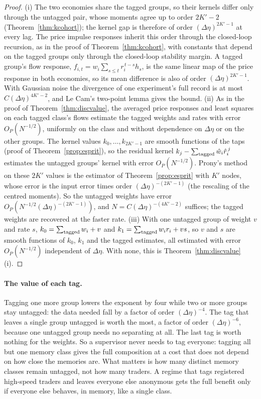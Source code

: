 \documentclass[12pt]{article}
\theoremstyle{definition}
\theoremstyle{remark}
\begin{document}
\begin{proof}
(i) The two economies share the tagged groups, so their kernels differ only through the untagged pair, whose moments agree up to order $2K'-2$ (Theorem~\ref{thm:kcohort}); the kernel gap is therefore of order $(\Delta\eta)^{2K'-1}$ at every lag. The price impulse responses inherit this order through the closed-loop recursion, as in the proof of Theorem~\ref{thm:kcohort}, with constants that depend on the tagged groups only through the closed-loop stability margin. A tagged group's flow response, $f_{i,t}=w_i\sum_{s\le t}r_i^{\,t-s}h_s$, is the same linear map of the price response in both economies, so its mean difference is also of order $(\Delta\eta)^{2K'-1}$. With Gaussian noise the divergence of one experiment's full record is at most $C(\Delta\eta)^{4K'-2}$, and Le Cam's two-point lemma gives the bound.
(ii) As in the proof of Theorem~\ref{thm:discvalue}, the averaged price responses and least squares on each tagged class's flows estimate the tagged weights and rates with error $O_P(N^{-1/2})$, uniformly on the class and without dependence on $\Delta\eta$ or on the other groups. The kernel values $k_0,\ldots,k_{2K'-1}$ are smooth functions of the taps (proof of Theorem~\ref{prop:esprit}), so the residual kernel $k_j-\sum_{\rm tagged}\hat w_i\hat r_i^{\,j}$ estimates the untagged groups' kernel with error $O_P(N^{-1/2})$. Prony's method on these $2K'$ values is the estimator of Theorem~\ref{prop:esprit} with $K'$ nodes, whose error is the input error times order $(\Delta\eta)^{-(2K'-1)}$ (the rescaling of the centred moments). So the untagged weights have error $O_P(N^{-1/2}(\Delta\eta)^{-(2K'-1)})$, and $N=C(\Delta\eta)^{-(4K'-2)}$ suffices; the tagged weights are recovered at the faster rate.
(iii) With one untagged group of weight $v$ and rate $s$, $k_0=\sum_{\rm tagged}w_i+v$ and $k_1=\sum_{\rm tagged}w_ir_i+vs$, so $v$ and $s$ are smooth functions of $k_0$, $k_1$ and the tagged estimates, all estimated with error $O_P(N^{-1/2})$ independent of $\Delta\eta$. With none, this is Theorem~\ref{thm:discvalue}(i).
\end{proof}

\paragraph{The value of each tag.} Tagging one more group lowers the exponent by four while two or more groups stay untagged: the data needed fall by a factor of order $(\Delta\eta)^{-4}$. The tag that leaves a single group untagged is worth the most, a factor of order $(\Delta\eta)^{-6}$, because one untagged group needs no separating at all. The last tag is worth nothing for the weights. So a supervisor never needs to tag everyone: tagging all but one memory class gives the full composition at a cost that does not depend on how close the memories are. What matters is how many distinct memory classes remain untagged, not how many traders. A regime that tags registered high-speed traders and leaves everyone else anonymous gets the full benefit only if everyone else behaves, in memory, like a single class.
\end{document}

